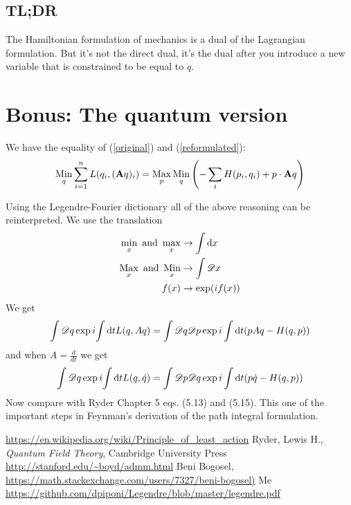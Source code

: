 \documentclass{article}
\begin{document}
\subsection{TL;DR}
The Hamiltonian formulation of mechanics is a dual of the Lagrangian formulation. But it's not the direct dual, it's the dual after you introduce a new variable that is constrained to be equal to $\dot{q}$.

\section{Bonus: The quantum version}
We have the equality of (\ref{original}) and (\ref{reformulated}):
\begin{equation}
\mathop{\mathrm{Min}}_q\sum_{i=1}^nL(q_i,(\mathbf{A} q)_i)
=\mathop{\mathrm{Max}}_p\mathop{\mathrm{Min}}_q\left(-\sum_iH(p_i,q_i)+p\cdot\mathbf{A} q\right)
\end{equation}

Using the Legendre-Fourier dictionary \cite{piponi} all of the above reasoning can be reinterpreted.
We use the translation
\begin{align*}
\min_x \mbox{ and } \max_x &\rightarrow \int \mathrm{d} x\\
\mathop{\mathrm{Max}}_x \mbox{ and } \mathop{\mathrm{Min}}_x &\rightarrow \int \mathcal{D} x\\
f(x) &\rightarrow \exp(if(x))
\end{align*}
We get
\[
\int\mathcal{D} q\exp i{\int \mathrm{d}tL(q,Aq)}=\int\mathcal{D} q\mathcal{D} p\exp i\int \mathrm{d}t( pAq-H(q,p))
\]
and when $A=\frac{d}{dt}$ we get
\[
\int\mathcal{D} q\exp i{\int \mathrm{d}tL(q,\dot{q})}=\int\mathcal{D} p\mathcal{D} q\exp i\int \mathrm{d}t(p\dot{q}-H(q,p))
\]
Now compare with Ryder \cite{ryder} Chapter 5 eqs. (5.13) and (5.15).
This one of the important steps in Feynman's derivation of the path integral formulation.
\begin{thebibliography}{99}
 \url{https://en.wikipedia.org/wiki/Principle_of_least_action}
 Ryder, Lewis H., \emph{Quantum Field Theory}, Cambridge University Press
 \url{http://stanford.edu/~boyd/admm.html}
 Beni Bogosel, \url{https://math.stackexchange.com/users/7327/beni-bogosel)}
 Me \url{https://github.com/dpiponi/Legendre/blob/master/legendre.pdf}
\end{thebibliography}
\end{document}
